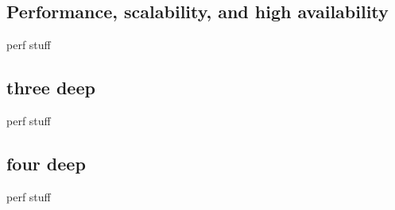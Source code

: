 \subsection{Performance, scalability, and high availability}
perf stuff
\subsection{three deep}
perf stuff
\subsection{four deep}
perf stuff
